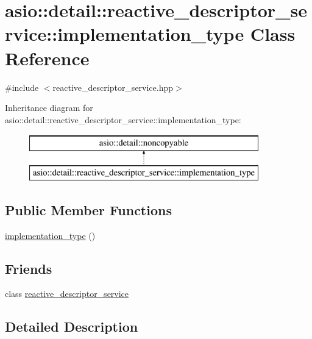 \hypertarget{classasio_1_1detail_1_1reactive__descriptor__service_1_1implementation__type}{}\section{asio\+:\+:detail\+:\+:reactive\+\_\+descriptor\+\_\+service\+:\+:implementation\+\_\+type Class Reference}
\label{classasio_1_1detail_1_1reactive__descriptor__service_1_1implementation__type}


{\ttfamily \#include $<$reactive\+\_\+descriptor\+\_\+service.\+hpp$>$}

Inheritance diagram for asio\+:\+:detail\+:\+:reactive\+\_\+descriptor\+\_\+service\+:\+:implementation\+\_\+type\+:\begin{figure}[H]
\begin{center}
\leavevmode
\includegraphics[height=2.000000cm]{classasio_1_1detail_1_1reactive__descriptor__service_1_1implementation__type}
\end{center}
\end{figure}
\subsection*{Public Member Functions}
\begin{DoxyCompactItemize}
\item 
\hyperlink{classasio_1_1detail_1_1reactive__descriptor__service_1_1implementation__type_ad0a53d8bb10e3bf8a0db75e5a1f8de75}{implementation\+\_\+type} ()
\end{DoxyCompactItemize}
\subsection*{Friends}
\begin{DoxyCompactItemize}
\item 
class \hyperlink{classasio_1_1detail_1_1reactive__descriptor__service_1_1implementation__type_a9513c10d04bfd7295b1cdfec0f2213a6}{reactive\+\_\+descriptor\+\_\+service}
\end{DoxyCompactItemize}


\subsection{Detailed Description}



